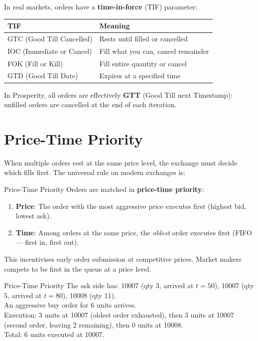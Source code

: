 \documentclass[12pt,a4paper,openany]{report}
\theoremstyle{definition}
\begin{document}
In real markets, orders have a \textbf{time-in-force} (TIF) parameter:
\begin{center}
\begin{tabular}{ll}
\toprule
\textbf{TIF} & \textbf{Meaning} \\
\midrule
GTC (Good Till Cancelled) & Rests until filled or cancelled \\
IOC (Immediate or Cancel) & Fill what you can, cancel remainder \\
FOK (Fill or Kill) & Fill entire quantity or cancel \\
GTD (Good Till Date) & Expires at a specified time \\
\bottomrule
\end{tabular}
\end{center}
In Prosperity, all orders are effectively \textbf{GTT} (Good Till next Timestamp): unfilled orders are cancelled at the end of each iteration.

\section{Price-Time Priority}

When multiple orders rest at the same price level, the exchange must decide which fills first. The universal rule on modern exchanges is:

\begin{definitionbox}{Price-Time Priority}
Orders are matched in \textbf{price-time priority}:
\begin{enumerate}
  \item \textbf{Price}: The order with the most aggressive price executes first (highest bid, lowest ask).
  \item \textbf{Time}: Among orders at the same price, the \emph{oldest} order executes first (FIFO — first in, first out).
\end{enumerate}
\end{definitionbox}

This incentivises early order submission at competitive prices. Market makers compete to be first in the queue at a price level.

\begin{examplebox}{Price-Time Priority}
The ask side has: 10007 (qty 3, arrived at $t=50$), 10007 (qty 5, arrived at $t=80$), 10008 (qty 11). \\
An aggressive buy order for 6 units arrives. \\
Execution: 3 units at 10007 (oldest order exhausted), then 3 units at 10007 (second order, leaving 2 remaining), then 0 units at 10008. \\
Total: 6 units executed at 10007.
\end{examplebox}
\end{document}
